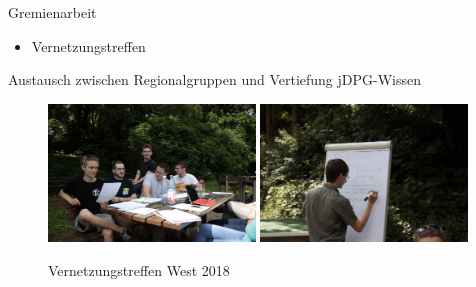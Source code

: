 \documentclass[
]{beamer}
\begin{document}
\begin{frame}{Gremienarbeit}
  \begin{minipage}[0.4\textwidth]
    \begin{itemize}
      \item Vernetzungstreffen
    \end{itemize}
    Austausch zwischen Regionalgruppen und Vertiefung jDPG-Wissen
  \end{minipage}%
  \begin{minipage}[0.6\textwidth]
    \begin{figure}
      \centering
      \includegraphics[width=0.49\textwidth]{figure/VT-West-2018_Austausch}\hfill
      \includegraphics[width=0.49\textwidth]{figure/VT-West-2018_wissen}\\
      \begin{center}
        Vernetzungstreffen West 2018
      \end{center}
     \end{figure}
  \end{minipage}
\end{frame}
\end{document}
